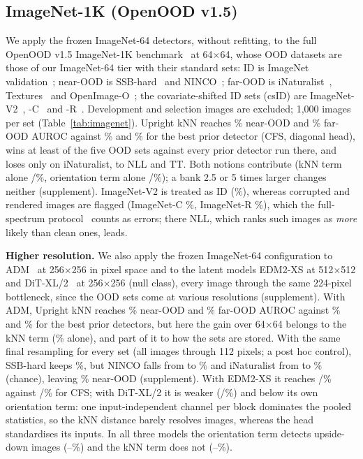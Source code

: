 \documentclass{article}
\begin{document}
\subsection{ImageNet-1K (OpenOOD v1.5)}
\label{sec:imagenet}
We apply the frozen ImageNet-64 detectors, without refitting, to the full OpenOOD v1.5 ImageNet-1K benchmark~\cite{zhang2023openood} at 64$\times$64, whose OOD datasets are those of our ImageNet-64 tier with their standard sets: ID is ImageNet validation~\cite{russakovsky2015imagenet}; near-OOD is SSB-hard~\cite{vaze2022openset} and NINCO~\cite{bitterwolf2023ninco}; far-OOD is iNaturalist~\cite{huang2021mos}, Textures~\cite{cimpoi2014dtd} and OpenImage-O~\cite{wang2022vim}; the covariate-shifted ID sets (csID) are ImageNet-V2~\cite{recht2019imagenetv2}, -C~\cite{hendrycks2019imagenetc} and -R~\cite{hendrycks2021imagenetr}. Development and selection images are excluded; 1{,}000 images per set (Table~\ref{tab:imagenet}). Upright kNN reaches \inNear\% near-OOD and \inFar\% far-OOD AUROC against \inNearPrior\% and \inFarPrior\% for the best prior detector (CFS, diagonal head), wins at least \inPriorWinMin{} of the five OOD sets against every prior detector run there, and loses only on iNaturalist, to NLL and TT. Both notions contribute (kNN term alone \inNearKnnT/\inFarKnnT\%, orientation term alone \inNearPose/\inFarPose\%); a bank 2.5 or 5 times larger changes neither (supplement). ImageNet-V2 is treated as ID (\inVtwo\%), whereas corrupted and rendered images are flagged (ImageNet-C \inC\%, ImageNet-R \inR\%), which the full-spectrum protocol~\cite{yang2023fsood} counts as errors; there NLL, which ranks such images as \emph{more} likely than clean ones, leads.

\textbf{Higher resolution.} We also apply the frozen ImageNet-64 configuration to ADM~\cite{dhariwal2021adm} at 256$\times$256 in pixel space and to the latent models EDM2-XS at 512$\times$512 and DiT-XL/2~\cite{peebles2023dit} at 256$\times$256 (null class), every image through the same 224-pixel bottleneck, since the OOD sets come at various resolutions (supplement). With ADM, Upright kNN reaches \hAdmNear\% near-OOD and \hAdmFar\% far-OOD AUROC against \hAdmNearPrior\% and \hAdmFarPrior\% for the best prior detectors, but here the gain over 64$\times$64 belongs to the kNN term (\hAdmNearKnnT\% alone), and part of it to how the sets are stored. With the same final resampling for every set (all images through 112 pixels; a post hoc control), SSB-hard keeps \hTwoSsbD\%, but NINCO falls from \hTwoNincoC{} to \hTwoNincoD\% and iNaturalist from \hTwoInatC{} to \hTwoInatD\% (chance), leaving \hTwoNearD\% near-OOD (supplement). With EDM2-XS it reaches \hEdmNear/\hEdmFar\% against \hEdmNearPrior/\hEdmFarPrior\% for CFS; with DiT-XL/2 it is weaker (\hDitNear/\hDitFar\%) and below its own orientation term: one input-independent channel per block dominates the pooled statistics, so the kNN distance barely resolves images, whereas the head standardises its inputs. In all three models the orientation term detects upside-down images (\hAdmVfPose--\hDitVfPose\%) and the kNN term does not (\hEdmVfKnnT--\hDitVfKnnT\%).
\end{document}

